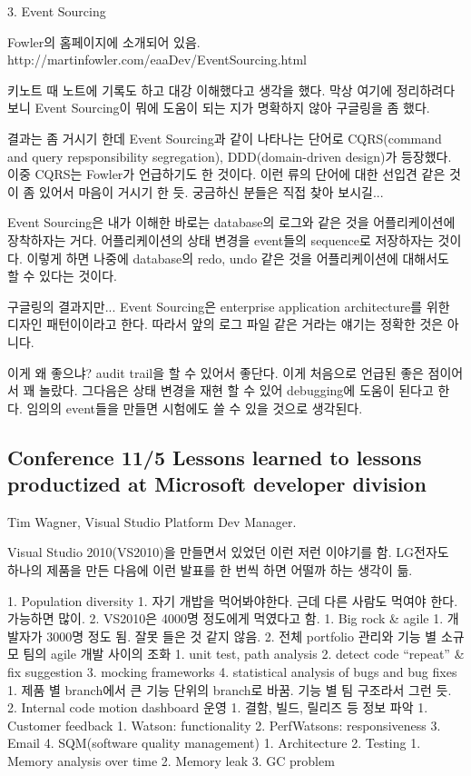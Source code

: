 \documentclass[a4paper]{article}
\begin{document}
3. Event Sourcing
 
Fowler의 홈페이지에 소개되어 있음.
http://martinfowler.com/eaaDev/EventSourcing.html
 
키노트 때 노트에 기록도 하고 대강 이해했다고 생각을 했다. 막상 여기에
정리하려다 보니 Event Sourcing이 뭐에 도움이 되는 지가 명확하지 않아
구글링을 좀 했다.
 
결과는 좀 거시기 한데 Event Sourcing과 같이 나타나는 단어로
CQRS(command and query repsponsibility segregation), DDD(domain-driven
design)가 등장했다. 이중 CQRS는 Fowler가 언급하기도 한 것이다. 이런
류의 단어에 대한 선입견 같은 것이 좀 있어서 마음이 거시기 한
듯. 궁금하신 분들은 직접 찾아 보시길...
 
Event Sourcing은 내가 이해한 바로는 database의 로그와 같은 것을
어플리케이션에 장착하자는 거다. 어플리케이션의 상태 변경을 event들의
sequence로 저장하자는 것이다. 이렇게 하면 나중에 database의 redo, undo
같은 것을 어플리케이션에 대해서도 할 수 있다는 것이다.
 
구글링의 결과지만... Event Sourcing은 enterprise application
architecture를 위한 디자인 패턴이이라고 한다. 따라서 앞의 로그 파일
같은 거라는 얘기는 정확한 것은 아니다.
 
이게 왜 좋으냐? audit trail을 할 수 있어서 좋단다. 이게 처음으로 언급된
좋은 점이어서 꽤 놀랐다. 그다음은 상태 변경을 재현 할 수 있어
debugging에 도움이 된다고 한다.  임의의 event들을 만들면 시험에도 쓸 수
있을 것으로 생각된다.

\subsection{Conference 11/5 Lessons learned to lessons productized at
  Microsoft developer division}
 
Tim Wagner, Visual Studio Platform Dev Manager.
 
Visual Studio 2010(VS2010)을 만들면서 있었던 이런 저런 이야기를
함. LG전자도 하나의 제품을 만든 다음에 이런 발표를 한 번씩 하면 어떨까
하는 생각이 듦.
 
1. Population diversity
1. 자기 개밥을 먹어봐야한다. 근데 다른 사람도 먹여야 한다. 가능하면 많이.
2. VS2010은 4000명 정도에게 먹였다고 함.
1. Big rock \& agile
1. 개발자가 3000명 정도 됨. 잘못 들은 것 같지 않음.
2. 전체 portfolio 관리와 기능 별 소규모 팀의 agile 개발 사이의 조화
1. unit test, path analysis
2. detect code “repeat” \& fix suggestion
3. mocking frameworks
4. statistical analysis of bugs and bug fixes
1. 제품 별 branch에서 큰 기능 단위의 branch로 바꿈.  기능 별 팀 구조라서 그런 듯.
2. Internal code motion dashboard 운영
1. 결함, 빌드, 릴리즈 등 정보 파악
1. Customer feedback
1. Watson: functionality
2. PerfWatsons: responsiveness
3. Email
4. SQM(software quality management)
1. Architecture
2. Testing
1. Memory analysis over time
2. Memory leak
3. GC problem
 
\end{document}
